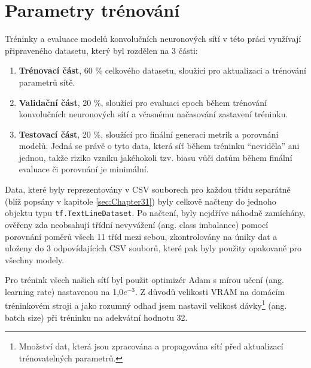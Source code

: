 \section{Parametry trénování}
\label{sec:Chapter53}
Tréninky a evaluace modelů konvolučních neuronových sítí v této práci využívají připraveného datasetu, který byl rozdělen na 3 části:
\begin{enumerate}
    \item \textbf{Trénovací část}, 60 \% celkového datasetu, sloužící pro aktualizaci a trénování parametrů sítě.
    \item \textbf{Validační část}, 20 \%, sloužící pro evaluaci epoch během trénování konvolučních neuronových sítí a včasnému načasování zastavení tréninku.
    \item \textbf{Testovací část}, 20 \%, sloužící pro finální generaci metrik a porovnání modelů. Jedná se právě o tyto data, která síť během tréninku \enquote{neviděla} ani jednou, takže riziko vzniku jakéhokoli tzv. biasu vůči datům během finální evaluace či porovnání je minimální.
\end{enumerate}

Data, které byly reprezentovány v CSV souborech pro každou třídu separátně (blíž popsány v kapitole \ref{sec:Chapter31}) byly celkově načteny do jednoho objektu typu \texttt{tf.TextLineDataset}. Po načtení, byly nejdříve náhodně zamíchány, ověřeny zda neobsahují třídní nevyvážení (ang. class imbalance) pomocí porovnání poměrů všech 11 tříd mezi sebou, zkontrolovány na úniky dat a uloženy do 3 odpovídajících CSV souborů, které pak byly použity opakovaně pro všechny modely.

Pro trénink všech našich sítí byl použit optimizér Adam s mírou učení (ang. learning rate) nastavenou na 1,0$e^{-3}$. Z důvodů velikosti VRAM na domácím tréninkovém stroji a jako rozumný odhad jsem nastavil velikost dávky\footnote{Množství dat, která jsou zpracována a propagována sítí před aktualizací trénovatelných parametrů.} (ang. batch size) při tréninku na adekvátní hodnotu 32.

\endinput